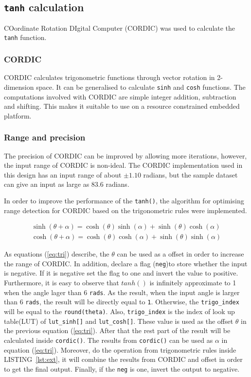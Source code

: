\documentclass[journal]{IEEEtran}
\newcommand{\eref}[1]{(\ref{#1})}
\newcommand{\lref}[1]{LISTING~\ref{#1}}
\begin{document}
\subsection{\texttt{tanh} calculation}

COordinate Rotation DIgital Computer (CORDIC) \cite{volder1959cordic} was used to calculate the \texttt{tanh} function.

\subsubsection{CORDIC}

CORDIC calculates trigonometric functions through vector rotation in 2-dimension space. It can be generalised to calculate \texttt{sinh} and \texttt{cosh} functions. The computations involved with CORDIC are simple integer addition, subtraction and shifting. This makes it suitable to use on a resource constrained embedded platform.

\subsubsection{Range and precision}

The precision of CORDIC can be improved by allowing more iterations, however, the input range of CORDIC is non-ideal. The CORDIC implementation used in this design has an input range of about $\pm 1.10$ radians, but the sample dataset can give an input as large as $83.6$ radians.

In order to improve the performance of the \texttt{tanh()}, the algorithm for optimising range detection for CORDIC based on the trigonometric rules were implemented. 

\begin{align}
\sinh(\theta + \alpha) = \cosh(\theta)\sinh(\alpha) + \sinh(\theta)\cosh(\alpha)
\label{eq:tri}\\
\cosh(\theta + \alpha) = \cosh(\theta)\cosh(\alpha) + \sinh(\theta)\sinh(\alpha)
\end{align}

As equations \eref{eq:tri} describe, the $\theta$ can be used as a offset in order to increase the range of CORDIC.  In addition, declare a flag (\texttt{neg})to store whether the input is negative. If it is negative set the flag to one and invert the value to positive. Furthermore, it is easy to observe that $tanh()$ is infinitely approximate to 1 when the angle lager than 6 \texttt{rads}. As the result, when the input angle is larger than 6 \texttt{rads}, the result will be directly equal to \texttt{1}. Otherwise, the \texttt{trigo\_index} will be equal to the \texttt{round(theta)}. Also, \texttt{trigo\_index} is the index of look up table(LUT) of \texttt{lut\_sinh[]} and \texttt{lut\_cosh[]}. These value is used as the offset $\theta$ in the previous equation \eref{eq:tri}. After that the rest part of the result will be calculated inside \texttt{cordic()}. The results from \texttt{cordic()} can be used as $\alpha$ in equation \eref{eq:tri}. Moreover, do the operation from trigonometric rules inside \lref{lst:ext}, it will combine the results from CORDIC and offset in order to get the final output. Finally, if the \texttt{neg} is one, invert the output to negative. \cite{llamocca2007fixed}
\end{document}
